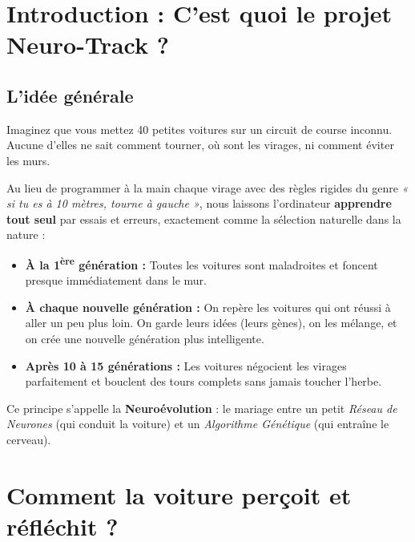 \documentclass[12pt,a4paper]{article}
\begin{document}
\tableofcontents
\newpage

\section{Introduction : C'est quoi le projet Neuro-Track ?}

\subsection{L'idée générale}
Imaginez que vous mettez 40 petites voitures sur un circuit de course inconnu. Aucune d'elles ne sait comment tourner, où sont les virages, ni comment éviter les murs. 

Au lieu de programmer à la main chaque virage avec des règles rigides du genre \textit{« si tu es à 10 mètres, tourne à gauche »}, nous laissons l'ordinateur \textbf{apprendre tout seul} par essais et erreurs, exactement comme la sélection naturelle dans la nature :
\begin{itemize}[leftmargin=*]
  \item \textbf{À la 1\textsuperscript{ère} génération :} Toutes les voitures sont maladroites et foncent presque immédiatement dans le mur.
  \item \textbf{À chaque nouvelle génération :} On repère les voitures qui ont réussi à aller un peu plus loin. On garde leurs idées (leurs gènes), on les mélange, et on crée une nouvelle génération plus intelligente.
  \item \textbf{Après 10 à 15 générations :} Les voitures négocient les virages parfaitement et bouclent des tours complets sans jamais toucher l'herbe.
\end{itemize}

Ce principe s'appelle la \textbf{Neuroévolution} : le mariage entre un petit \textit{Réseau de Neurones} (qui conduit la voiture) et un \textit{Algorithme Génétique} (qui entraîne le cerveau).

\section{Comment la voiture perçoit et réfléchit ?}
\end{document}
